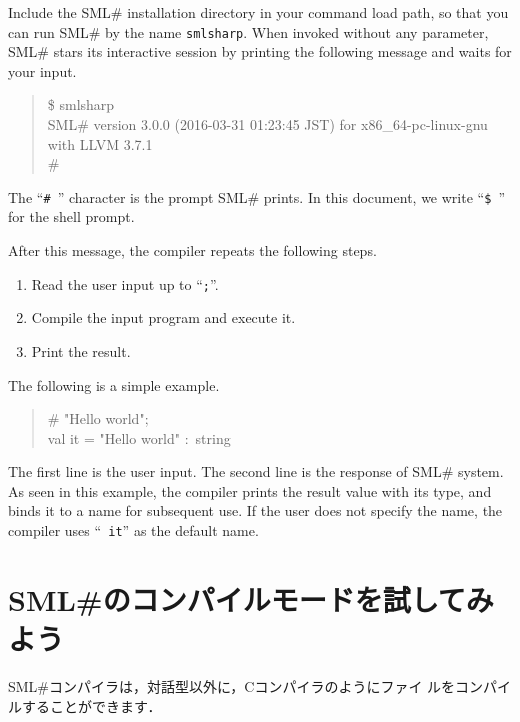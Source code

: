\documentclass{jbook}
\newif\ifjp
\newcommand{\txt}[2]{#1}
\newcommand{\smlsharp}{SML\#}
\newcommand{\version}{3.0.0}
\newcommand{\releaseDate}{2016-03-31 01:23:45 JST}
\newenvironment{program}{\begin{quote}\begin{tt}}%
                        {\end{tt}\end{quote}}
\begin{document}
	Include the \smlsharp{} installation directory in your command
load path,  so that you can run \smlsharp{} by the name {\tt smlsharp}.
	When invoked without any parameter, \smlsharp{} stars its
interactive session by printing the following message and waits for your
input.
\begin{program}
\$ smlsharp\\
SML\# version \version{} (\releaseDate{}) for x86\_64-pc-linux-gnu with LLVM 3.7.1\\
\# 
\end{program}
	The ``{\tt \#\ }'' character is the prompt \smlsharp{}
prints.
	In this document, we write ``{\tt \$\ }'' for the 
shell prompt.

	After this message, the compiler repeats the following steps. 
\begin{enumerate}
\item Read the user input up to ``{\tt ;}''.
\item Compile the input program and execute it.
\item Print the result.
\end{enumerate}
	The following is a simple example.
\begin{tt}
\begin{quote}
\# "Hello world";\\
val it = "Hello world" :~string
\end{quote}
\end{tt}
	The first line is the user input.
	The second line is the response of \smlsharp{} system.
	As seen in this example, the compiler prints the result value with
its type, and binds it to a name for subsequent use.
	If the user does not specify the name, the compiler uses  ``{\tt
it}'' as the default name.

\fi%

\section{
\txt
{\smlsharp{}のコンパイルモードを試してみよう}
{Let's try \smlsharp{} compile mode}
}
\label{sec:tutorialCompile}

\ifjp%
	\smlsharp{}コンパイラは，対話型以外に，Cコンパイラのようにファイ
ルをコンパイルすることができます．
\end{document}

